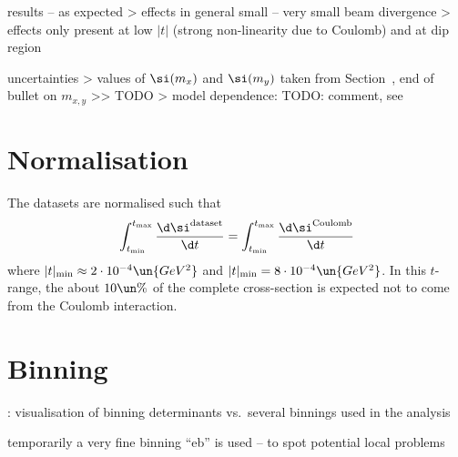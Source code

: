 \> results -- as expected
\>> effects in general small -- very small beam divergence
\>> effects only present at low $|t|$ (strong non-linearity due to Coulomb) and at dip region

\> uncertainties
\>> values of $\si(m_x)$ and $\si(m_y)$ taken from Section~, end of bullet on $m_{x,y}$
\>>> TODO
\>> model dependence: TODO: comment, see 


\chapter[normalisation]{Normalisation}

The datasets are normalised such that
$$\int_{t_{\rm min}}^{t_{\rm max}} {\d\si^{\rm dataset}\over \d t} = \int_{t_{\rm min}}^{t_{\rm max}} {\d\si^{\rm Coulomb}\over \d t}$$
where $|t|_{\rm min} \approx 2\cdot10^{-4}\un{GeV^2}$ and $|t|_{\rm min} = 8\cdot10^{-4}\un{GeV^2}$. In this $t$-range, the about $10\un{\%}$ of the complete cross-section is expected not to come from the Coulomb interaction.



\chapter[binning]{Binning}

\iffalse

\> method: binning ``ob-$\langle n\rangle$-$\langle u\rangle$-$\langle w_m\rangle$`` is built as follows
\>> at low $|t|$ ($|t| \ls 0.4\un{GeV^2}$): bin size about $n\times \si(\hbox{$t$ smearing})$
\>> at mid $|t|$: bin size for a fixed statistical uncertainty $u\un{\%}$
\>> if needed at large $|t|$: constant bin size $w_m$ (in $\rm GeV^2$) to avoid excessively large bins

\> binnings used in analysis
\>> ob-1-20-0.05
\>> ob-2-10-0.05
\>> ob-3-5-0.05
\fi

\>  : visualisation of binning determinants vs.~several binnings used in the analysis

\> temporarily a very fine binning ``eb'' is used -- to spot potential local problems



